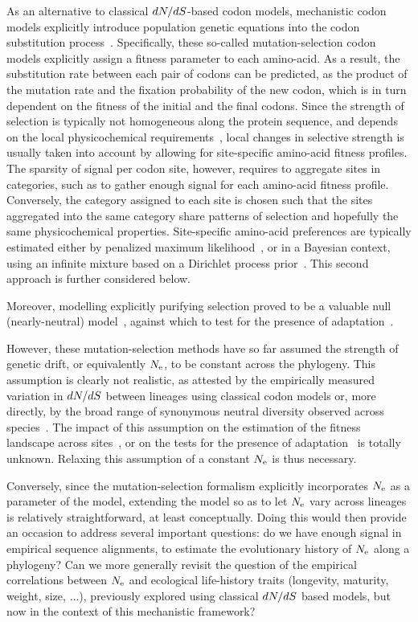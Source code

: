 As an alternative to classical $dN/dS$-based codon models, mechanistic codon models explicitly introduce population genetic equations into the codon substitution process~\citep{Halpern1998}.
Specifically, these so-called mutation-selection codon models explicitly assign a fitness parameter to each amino-acid.
As a result, the substitution rate between each pair of codons can be predicted, as the product of the mutation rate and the fixation probability of the new codon, which is in turn dependent on the fitness of the initial and the final codons.
Since the strength of selection is typically not homogeneous along the protein sequence, and depends on the local physicochemical requirements~\citep{Echave2016, Goldstein2016,Goldstein2017}, local changes in selective strength is usually taken into account by allowing for site-specific amino-acid fitness profiles.
The sparsity of signal per codon site, however, requires to aggregate sites in categories, such as to gather enough signal for each amino-acid fitness profile.
Conversely, the category assigned to each site is chosen such that the sites aggregated into the same category share patterns of selection and hopefully the same physicochemical properties.
Site-specific amino-acid preferences are typically estimated either by penalized maximum likelihood~\citep{Tamuri2012,Tamuri2014}, or in a Bayesian context, using an infinite mixture based on a Dirichlet process prior~\citep{Rodrigue2010,Rodrigue2014}.
This second approach is further considered below.

Moreover, modelling explicitly purifying selection proved to be a valuable null (nearly-neutral) model~\citep{Spielman2015, DosReis2015}, against which to test for the presence of adaptation~\citep{Rodrigue2016,Bloom2017}.

However, these mutation-selection methods have so far assumed the strength of genetic drift, or equivalently $N_{\text{e}}$, to be constant across the phylogeny.
This assumption is clearly not realistic, as attested by the empirically measured variation in $dN/dS$ between lineages using classical codon models or, more directly, by the broad range of synonymous neutral diversity observed across species~\citep{Galtier2016}.
The impact of this assumption on the estimation of the fitness landscape across sites~\citep{Tamuri2014, Rodrigue2014}, or on the tests for the presence of adaptation~\citep{Rodrigue2016} is totally unknown.
Relaxing this assumption of a constant $N_{\text{e}}$ is thus necessary.

Conversely, since the mutation-selection formalism explicitly incorporates $N_{\text{e}}$ as a parameter of the model, extending the model so as to let $N_{\text{e}}$ vary across lineages is relatively straightforward, at least conceptually.
Doing this would then provide an occasion to address several important questions: do we have enough signal in empirical sequence alignments, to estimate the evolutionary history of $N_{\text{e}}$ along a phylogeny?
Can we more generally revisit the question of the empirical correlations between $N_{\text{e}}$ and ecological life-history traits (longevity, maturity, weight, size, $\hdots$), previously explored using classical $dN/dS$ based models, but now in the context of this mechanistic framework?



